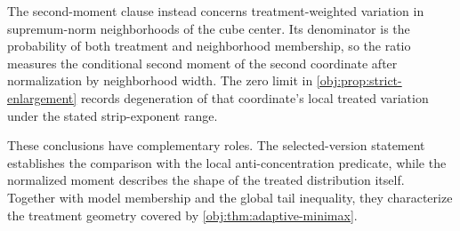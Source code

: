 The second-moment clause instead concerns treatment-weighted variation in supremum-norm neighborhoods of the cube center. Its denominator is the probability of both treatment and neighborhood membership, so the ratio measures the conditional second moment of the second coordinate after normalization by neighborhood width. The zero limit in \cref{obj:prop:strict-enlargement} records degeneration of that coordinate's local treated variation under the stated strip-exponent range.

These conclusions have complementary roles. The selected-version statement establishes the comparison with the local anti-concentration predicate, while the normalized moment describes the shape of the treated distribution itself. Together with model membership and the global tail inequality, they characterize the treatment geometry covered by \cref{obj:thm:adaptive-minimax}.
